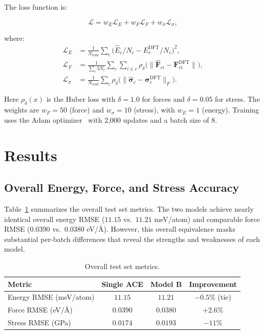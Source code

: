 \documentclass[twoside,prb,aps,floatfix,superscriptaddress,longbibliography]{revtex4-2}
\begin{document}
The loss function is:

\begin{equation}
\mathcal{L} = w_E \mathcal{L}_E + w_F \mathcal{L}_F + w_\sigma \mathcal{L}_\sigma,
\label{eq:loss}
\end{equation}

where:
\begin{align}
\mathcal{L}_E &= \frac{1}{N_{\mathrm{conf}}} \sum_c \big( \hat{E}_c / N_c - E_c^{\mathrm{DFT}} / N_c \big)^2, \\
\mathcal{L}_F &= \frac{1}{\sum_c 3 N_c} \sum_c \sum_{i \in c} \rho_\delta \big( \| \hat{\mathbf{F}}_{ci} - \mathbf{F}_{ci}^{\mathrm{DFT}} \| \big), \\
\mathcal{L}_\sigma &= \frac{1}{N_{\mathrm{conf}}} \sum_c \rho_\delta\big( \| \hat{\boldsymbol{\sigma}}_c - \boldsymbol{\sigma}_c^{\mathrm{DFT}} \|_F \big).
\end{align}

Here $\rho_\delta(x)$ is the Huber loss with $\delta = 1.0$ for forces and $\delta = 0.05$ for stress. The weights are $w_F = 50$ (force) and $w_\sigma = 10$ (stress), with $w_E = 1$ (energy). Training uses the Adam optimizer~\cite{Kingma2015Adam} with 2,000 updates and a batch size of 8.

\section{Results}
\label{sec:results}

\subsection{Overall Energy, Force, and Stress Accuracy}
\label{sec:overall}

Table~\ref{tab:overall} summarizes the overall test set metrics. The two models achieve nearly identical overall energy RMSE ($11.15$ vs.\ $11.21$ meV/atom) and comparable force RMSE ($0.0390$ vs.\ $0.0380$ eV/{\AA}). However, this overall equivalence masks substantial per-batch differences that reveal the strengths and weaknesses of each model.

\begin{table}[t]
\caption{Overall test set metrics.}
\label{tab:overall}
\begin{ruledtabular}
\begin{tabular}{lccc}
\toprule
Metric & Single ACE & Model B & Improvement \\
\midrule
Energy RMSE (meV/atom) & $11.15$ & $11.21$ & $-0.5\%$ (tie) \\
Force RMSE (eV/{\AA}) & $0.0390$ & $0.0380$ & $+2.6\%$ \\
Stress RMSE (GPa) & $0.0174$ & $0.0193$ & $-11\%$ \\
\bottomrule
\end{tabular}
\end{ruledtabular}
\end{table}
\end{document}
